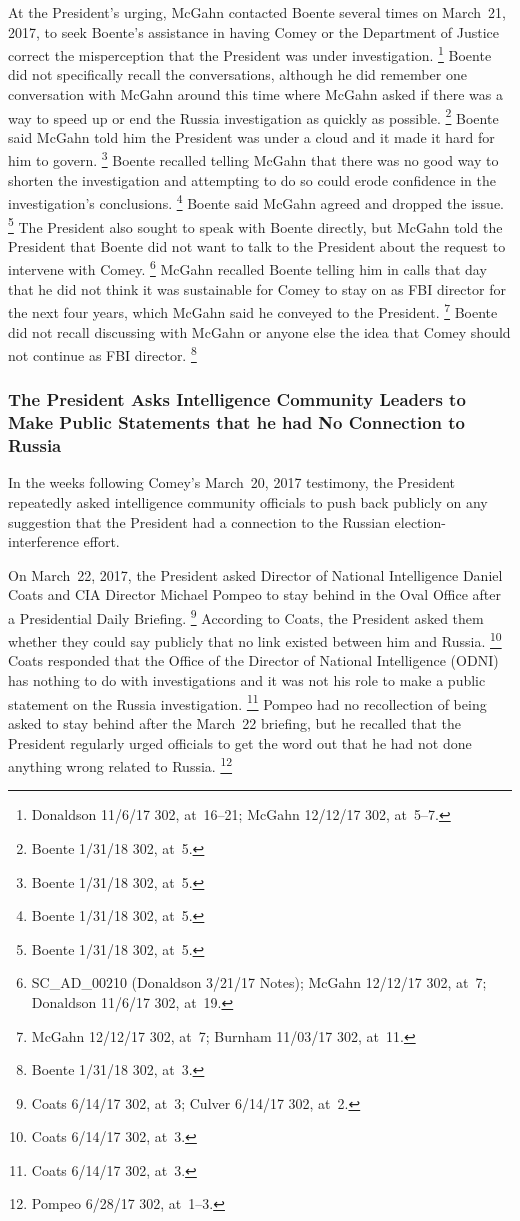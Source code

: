 At the President's urging, McGahn contacted Boente several times on March~21, 2017, to seek Boente's assistance in having Comey or the Department of Justice correct the misperception that the President was under investigation.%
\footnote{Donaldson 11/6/17 302, at~16--21;
McGahn 12/12/17 302, at~5--7.}
Boente did not specifically recall the conversations, although he did remember one conversation with McGahn around this time where McGahn asked if there was a way to speed up or end the Russia investigation as quickly as possible.%
\footnote{Boente 1/31/18 302, at~5.}
Boente said McGahn told him the President was under a cloud and it made it hard for him to govern.%
\footnote{Boente 1/31/18 302, at~5.}
Boente recalled telling McGahn that there was no good way to shorten the investigation and attempting to do so could erode confidence in the investigation's conclusions.%
\footnote{Boente 1/31/18 302, at~5.}
Boente said McGahn agreed and dropped the issue.%
\footnote{Boente 1/31/18 302, at~5.}
The President also sought to speak with Boente directly, but McGahn told the President that Boente did not want to talk to the President about the request to intervene with Comey.%
\footnote{SC\_AD\_00210 (Donaldson 3/21/17 Notes);
McGahn 12/12/17 302, at~7;
Donaldson 11/6/17 302, at~19.}
McGahn recalled Boente telling him in calls that day that he did not think it was sustainable for Comey to stay on as FBI director for the next four years, which McGahn said he conveyed to the President.%
\footnote{McGahn 12/12/17 302, at~7;
Burnham 11/03/17 302, at~11.}
Boente did not recall discussing with McGahn or anyone else the idea that Comey should not continue as FBI director.%
\footnote{Boente 1/31/18 302, at~3.}

\subsubsection{The President Asks Intelligence Community Leaders to Make Public Statements that he had No Connection to Russia}

In the weeks following Comey's March~20, 2017 testimony, the President repeatedly asked intelligence community officials to push back publicly on any suggestion that the President had a connection to the Russian election-interference effort.

On March~22, 2017, the President asked Director of National Intelligence Daniel Coats and CIA Director Michael Pompeo to stay behind in the Oval Office after a Presidential Daily Briefing.%
\footnote{Coats 6/14/17 302, at~3;
Culver 6/14/17 302, at~2.}
According to Coats, the President asked them whether they could say publicly that no link existed between him and Russia.%
\footnote{Coats 6/14/17 302, at~3.}
Coats responded that the Office of the Director of National Intelligence (ODNI) has nothing to do with investigations and it was not his role to make a public statement on the Russia investigation.%
\footnote{Coats 6/14/17 302, at~3.}
Pompeo had no recollection of being asked to stay behind after the March~22 briefing, but he recalled that the President regularly urged officials to get the word out that he had not done anything wrong related to Russia.%
\footnote{Pompeo 6/28/17 302, at~1--3.}

